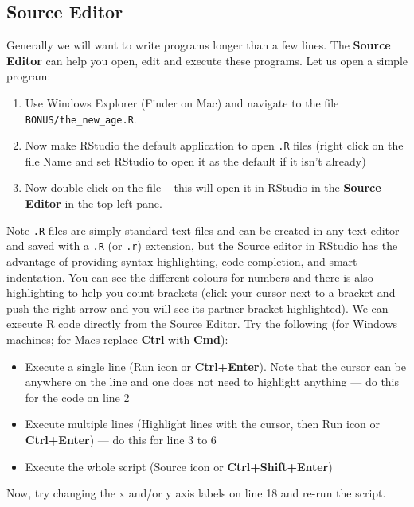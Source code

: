\documentclass[
]{book}
\providecommand{\tightlist}{%
  \setlength{\itemsep}{0pt}\setlength{\parskip}{0pt}}
\begin{document}
\hypertarget{source-editor}{%
\subsection{Source Editor}\label{source-editor}}

Generally we will want to write programs longer than a few lines. The \textbf{Source Editor} can help you open, edit and execute these programs. Let us open a simple program:

\begin{enumerate}
\def\labelenumi{\arabic{enumi}.}
\item
  Use Windows Explorer (Finder on Mac) and navigate to the file \texttt{BONUS/the\_new\_age.R}.
\item
  Now make RStudio the default application to open \texttt{.R} files (right click on the file Name and set RStudio to open it as the default if it isn't already)
\item
  Now double click on the file -- this will open it in RStudio in the \textbf{Source Editor} in the top left pane.
\end{enumerate}

Note \texttt{.R} files are simply standard text files and can be created in any text editor and saved with a \texttt{.R} (or \texttt{.r}) extension, but the Source editor in RStudio has the advantage of providing syntax highlighting, code completion, and smart indentation. You can see the different colours for numbers and there is also highlighting to help you count brackets (click your cursor next to a bracket and push the right arrow and you will see its partner bracket highlighted). We can execute R code directly from the Source Editor. Try the following (for Windows machines; for Macs replace \textbf{Ctrl} with \textbf{Cmd}):

\begin{itemize}
\tightlist
\item
  Execute a single line (Run icon or \textbf{Ctrl+Enter}). Note that the cursor can be anywhere on the line and one does not need to highlight anything --- do this for the code on line 2
\item
  Execute multiple lines (Highlight lines with the cursor, then Run icon or \textbf{Ctrl+Enter}) --- do this for line 3 to 6
\item
  Execute the whole script (Source icon or \textbf{Ctrl+Shift+Enter})
\end{itemize}

Now, try changing the x and/or y axis labels on line 18 and re-run the script.
\end{document}
